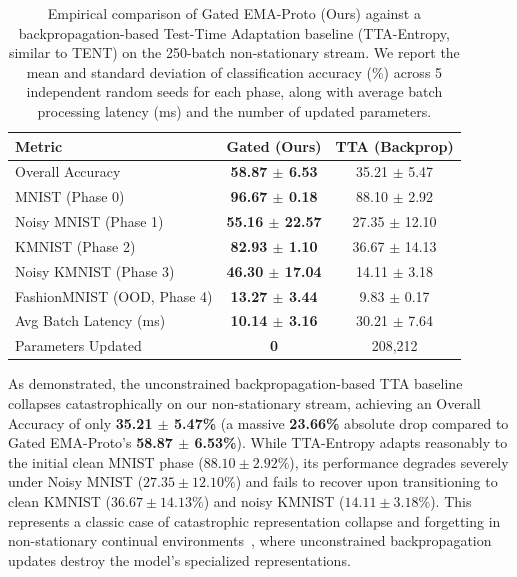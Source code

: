 \documentclass{article}
\theoremstyle{plain}
\theoremstyle{definition}
\theoremstyle{remark}
\begin{document}
\begin{table}[h]
\caption{Empirical comparison of Gated EMA-Proto (Ours) against a backpropagation-based Test-Time Adaptation baseline (TTA-Entropy, similar to TENT) on the 250-batch non-stationary stream. We report the mean and standard deviation of classification accuracy (\%) across 5 independent random seeds for each phase, along with average batch processing latency (ms) and the number of updated parameters.}
\label{tab:tta_comparison}
\vskip 0.1in
\begin{center}
\begin{scriptsize}
\begin{sc}
\setlength{\tabcolsep}{1.5pt}
\begin{tabular}{lcc}
\toprule
Metric & Gated (Ours) & TTA (Backprop) \\
\midrule
Overall Accuracy & \textbf{58.87 $\pm$ 6.53} & 35.21 $\pm$ 5.47 \\
MNIST (Phase 0) & \textbf{96.67 $\pm$ 0.18} & 88.10 $\pm$ 2.92 \\
Noisy MNIST (Phase 1) & \textbf{55.16 $\pm$ 22.57} & 27.35 $\pm$ 12.10 \\
KMNIST (Phase 2) & \textbf{82.93 $\pm$ 1.10} & 36.67 $\pm$ 14.13 \\
Noisy KMNIST (Phase 3) & \textbf{46.30 $\pm$ 17.04} & 14.11 $\pm$ 3.18 \\
FashionMNIST (OOD, Phase 4) & \textbf{13.27 $\pm$ 3.44} & 9.83 $\pm$ 0.17 \\
\midrule
Avg Batch Latency (ms) & \textbf{10.14 $\pm$ 3.16} & 30.21 $\pm$ 7.64 \\
Parameters Updated & \textbf{0} & 208,212 \\
\bottomrule
\end{tabular}
\end{sc}
\end{scriptsize}
\end{center}
\vskip -0.1in
\end{table}

As demonstrated, the unconstrained backpropagation-based TTA baseline collapses catastrophically on our non-stationary stream, achieving an Overall Accuracy of only \textbf{35.21 $\pm$ 5.47\%} (a massive \textbf{23.66\%} absolute drop compared to Gated EMA-Proto's \textbf{58.87 $\pm$ 6.53\%}). While TTA-Entropy adapts reasonably to the initial clean MNIST phase ($88.10 \pm 2.92\%$), its performance degrades severely under Noisy MNIST ($27.35 \pm 12.10\%$) and fails to recover upon transitioning to clean KMNIST ($36.67 \pm 14.13\%$) and noisy KMNIST ($14.11 \pm 3.18\%$). This represents a classic case of catastrophic representation collapse and forgetting in non-stationary continual environments~\cite{cotta, sar}, where unconstrained backpropagation updates destroy the model's specialized representations. 
\end{document}
